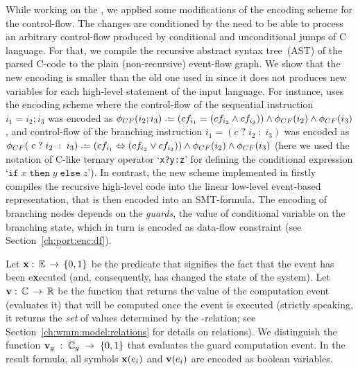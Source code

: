 While working on the \porthos[2], we applied some modifications of the encoding scheme for the control-flow.
The changes are conditioned by the need to be able to process an arbitrary control-flow produced by conditional and unconditional jumps of C language.
For that, we compile the recursive abstract syntax tree~(AST) of the parsed C-code to the plain (non-recursive) event-flow graph.
We show %
that the new encoding is smaller than the old one used in \porthos{} since it does not produces new variables for each high-level statement of the input language.
For instance, \porthos{} uses the encoding scheme where the control-flow of the sequential instruction $i_1 = i_2; i_3$ was encoded as
$\phi_{CF}(i_2;i_3) \defeq (cf_{i_1} = (cf_{i_2} \land cf_{i_3})) \land \phi_{CF}(i_2) \land \phi_{CF}(i_3)$,
and control-flow of the branching instruction $i_1 = (c \; ? \; i_2 \; : \; i_3)$ was encoded as
$\phi_{CF}( \; c \; ? \; i_2 \; : \; i_3) \defeq (cf_{i_1} \Leftrightarrow (cf_{i_2} \lor cf_{i_3})) \land \phi_{CF}(i_2) \land \phi_{CF}(i_3)$
(here we used the notation of C-like ternary operator `\texttt{x?y:z}' for defining the conditional expression `$\mathtt{if}\;x\;\mathtt{then}\;y\;\mathtt{else}\;z$').
In contrast, the new scheme implemented in \porthos[2] firstly compiles the recursive high-level code into the linear low-level event-based representation, that is then encoded into an SMT-formula. The encoding of branching nodes depends on the \textit{guards}, the value of conditional variable on the branching state, which in turn is encoded as data-flow constraint (see Section~\ref{ch:port:enc:df}).

Let $\mathbf{x}:\,\mathbb{E}\,\rightarrow\,\{0,1\}$ be the predicate that signifies the fact that the event has been e\textbf{x}ecuted (and, consequently, has changed the state of the system).
Let $\mathbf{v}:\,\mathbb{C}\,\rightarrow\,\mathbb{R}$ be the function that returns the value of the computation event (evaluates it) that will be computed once the event is executed (strictly speaking, it returns the \textit{set} of values determined by the \rf-relation; see Section~\ref{ch:wmm:model:relations} for details on relations).
We distinguish the function ${\mathbf{v}_g\;:\;\mathbb{C}_g\;\rightarrow\;\{0,1\}}$ that evaluates the guard computation event. In the result formula, all symbols $\mathbf{x}(e_i)$ and $\mathbf{v}(e_i)$ are encoded as boolean variables.


